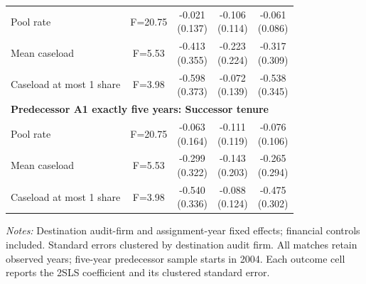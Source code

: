 \documentclass[10pt]{article}
\begin{document}
\begin{minipage}{19cm}
\begin{threeparttable}
\begin{tabular}{p{}cccc}
Pool rate & F=20.75 & \shortstack{-0.021\\(0.137)} & \shortstack{-0.106\\(0.114)} & \shortstack{-0.061\\(0.086)} \\
Mean caseload & F=5.53 & \shortstack{-0.413\\(0.355)} & \shortstack{-0.223\\(0.224)} & \shortstack{-0.317\\(0.309)} \\
Caseload at most 1 share & F=3.98 & \shortstack{-0.598\\(0.373)} & \shortstack{-0.072\\(0.139)} & \shortstack{-0.538\\(0.345)} \\
\multicolumn{5}{l}{\textbf{Predecessor A1 exactly five years: Successor tenure}} \\
Pool rate & F=20.75 & \shortstack{-0.063\\(0.164)} & \shortstack{-0.111\\(0.119)} & \shortstack{-0.076\\(0.106)} \\
Mean caseload & F=5.53 & \shortstack{-0.299\\(0.322)} & \shortstack{-0.143\\(0.203)} & \shortstack{-0.265\\(0.294)} \\
Caseload at most 1 share & F=3.98 & \shortstack{-0.540\\(0.336)} & \shortstack{-0.088\\(0.124)} & \shortstack{-0.475\\(0.302)} \\
\bottomrule
\end{tabular}
\begin{tablenotes}\fontsize{9}{11}\selectfont
\item \raggedright \fontsize{9}{11}\selectfont \textit{Notes:} Destination audit-firm and assignment-year fixed effects; financial controls included. Standard errors clustered by destination audit firm. All matches retain observed years; five-year predecessor sample starts in 2004. Each outcome cell reports the 2SLS coefficient and its clustered standard error.
\end{tablenotes}
\end{threeparttable}

\end{minipage}
\end{document}

